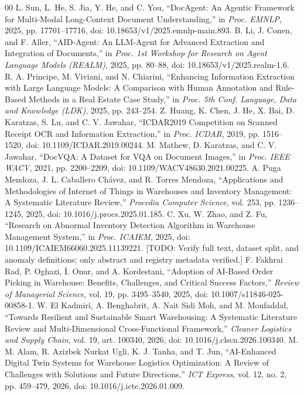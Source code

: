 \documentclass[conference]{IEEEtran}
\begin{document}
\begin{thebibliography}{00}
 L. Sun, L. He, S. Jia, Y. He, and C. You, ``DocAgent: An Agentic Framework for Multi-Modal Long-Context Document Understanding,'' in \textit{Proc. EMNLP}, 2025, pp. 17701--17716, doi: 10.18653/v1/2025.emnlp-main.893.
 B. Li, J. Conen, and F. Aller, ``AID-Agent: An LLM-Agent for Advanced Extraction and Integration of Documents,'' in \textit{Proc. 1st Workshop for Research on Agent Language Models (REALM)}, 2025, pp. 80--88, doi: 10.18653/v1/2025.realm-1.6.
 R. A. Principe, M. Viviani, and N. Chiarini, ``Enhancing Information Extraction with Large Language Models: A Comparison with Human Annotation and Rule-Based Methods in a Real Estate Case Study,'' in \textit{Proc. 5th Conf. Language, Data and Knowledge (LDK)}, 2025, pp. 243--254.
 Z. Huang, K. Chen, J. He, X. Bai, D. Karatzas, S. Lu, and C. V. Jawahar, ``ICDAR2019 Competition on Scanned Receipt OCR and Information Extraction,'' in \textit{Proc. ICDAR}, 2019, pp. 1516--1520, doi: 10.1109/ICDAR.2019.00244.
 M. Mathew, D. Karatzas, and C. V. Jawahar, ``DocVQA: A Dataset for VQA on Document Images,'' in \textit{Proc. IEEE WACV}, 2021, pp. 2200--2209, doi: 10.1109/WACV48630.2021.00225.
 A. Puga Mendoza, J. L. Caballero Ch\'avez, and R. Torres Mendoza, ``Applications and Methodologies of Internet of Things in Warehouses and Inventory Management: A Systematic Literature Review,'' \textit{Procedia Computer Science}, vol. 253, pp. 1236--1245, 2025, doi: 10.1016/j.procs.2025.01.185.
 C. Xu, W. Zhao, and Z. Fu, ``Research on Abnormal Inventory Detection Algorithm in Warehouse Management System,'' in \textit{Proc. ICAIEM}, 2025, doi: 10.1109/ICAIEM66060.2025.11139221. [TODO: Verify full text, dataset split, and anomaly definitions; only abstract and registry metadata verified.]
 F. Fakhrai Rad, P. Oghazi, \.I. Onur, and A. Kordestani, ``Adoption of AI-Based Order Picking in Warehouse: Benefits, Challenges, and Critical Success Factors,'' \textit{Review of Managerial Science}, vol. 19, pp. 3495--3540, 2025, doi: 10.1007/s11846-025-00858-1.
 W. El Kadmiri, A. Benghabrit, A. Nait Sidi Moh, and M. Moufaddal, ``Towards Resilient and Sustainable Smart Warehousing: A Systematic Literature Review and Multi-Dimensional Cross-Functional Framework,'' \textit{Cleaner Logistics and Supply Chain}, vol. 19, art. 100340, 2026, doi: 10.1016/j.clscn.2026.100340.
 M. M. Alam, R. Azizbek Nurkat Ugli, K. J. Tanha, and T. Jun, ``AI-Enhanced Digital Twin Systems for Warehouse Logistics Optimization: A Review of Challenges with Solutions and Future Directions,'' \textit{ICT Express}, vol. 12, no. 2, pp. 459--479, 2026, doi: 10.1016/j.icte.2026.01.009.

\end{thebibliography}
\end{document}
